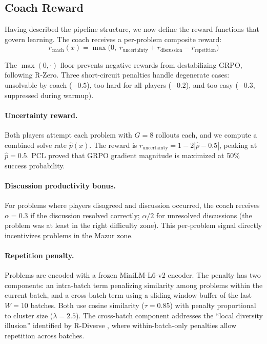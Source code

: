 \documentclass{article}
\begin{document}
\subsection{Coach Reward}
\label{sec:coach_reward}

Having described the pipeline structure, we now define the reward functions that govern learning. The coach receives a per-problem composite reward:
\begin{equation}
    r_{\text{coach}}(x) = \max\!\big(0,\; r_{\text{uncertainty}} + r_{\text{discussion}} - r_{\text{repetition}}\big)
\end{equation}

The $\max(0, \cdot)$ floor prevents negative rewards from destabilizing GRPO, following R-Zero. Three short-circuit penalties handle degenerate cases: unsolvable by coach ($-0.5$), too hard for all players ($-0.2$), and too easy ($-0.3$, suppressed during warmup).

\paragraph{Uncertainty reward.} Both players attempt each problem with $G\!=\!8$ rollouts each, and we compute a combined solve rate $\hat{p}(x)$. The reward is $r_{\text{uncertainty}} = 1 - 2|\hat{p} - 0.5|$, peaking at $\hat{p} = 0.5$. PCL \citep{pcl2025} proved that GRPO gradient magnitude is maximized at 50\% success probability.

\paragraph{Discussion productivity bonus.} For problems where players disagreed and discussion occurred, the coach receives $\alpha = 0.3$ if the discussion resolved correctly; $\alpha/2$ for unresolved discussions (the problem was at least in the right difficulty zone). This per-problem signal directly incentivizes problems in the Mazur zone.

\paragraph{Repetition penalty.} Problems are encoded with a frozen MiniLM-L6-v2 encoder. The penalty has two components: an intra-batch term penalizing similarity among problems within the current batch, and a cross-batch term using a sliding window buffer of the last $W\!=\!10$ batches. Both use cosine similarity ($\tau = 0.85$) with penalty proportional to cluster size ($\lambda = 2.5$). The cross-batch component addresses the ``local diversity illusion'' identified by R-Diverse \citep{rdiverse2026}, where within-batch-only penalties allow repetition across batches.
\end{document}
